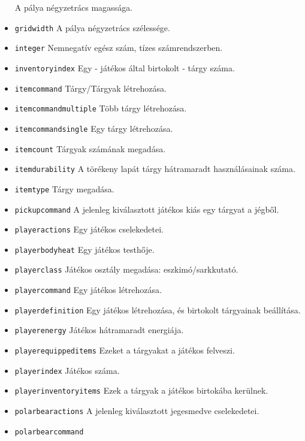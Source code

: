 \begin{itemize}
A pálya négyzetrács magassága.
\item \texttt{grid\textunderscore{}width}
A pálya négyzetrács szélessége.
\item \texttt{integer}
Nemnegatív egész szám, tízes számrendszerben.
\item \texttt{inventory\textunderscore{}index}
Egy - játékos által birtokolt - tárgy száma.
\item \texttt{item\textunderscore{}command}
Tárgy/Tárgyak létrehozása.
\item \texttt{item\textunderscore{}command\textunderscore{}multiple}
Több tárgy létrehozása.
\item \texttt{item\textunderscore{}command\textunderscore{}single}
Egy tárgy létrehozása.
\item \texttt{item\textunderscore{}count}
Tárgyak számának megadása.
\item \texttt{item\textunderscore{}durability}
A törékeny lapát tárgy hátramaradt használásainak száma.
\item \texttt{item\textunderscore{}type}
Tárgy megadása.
\item \texttt{pickup\textunderscore{}command}
A jelenleg kiválasztott játékos kiás egy tárgyat a jégből.
\item \texttt{player\textunderscore{}actions}
Egy játékos cselekedetei.
\item \texttt{player\textunderscore{}bodyheat}
Egy játékos testhője.
\item \texttt{player\textunderscore{}class}
Játékos osztály megadása: eszkimó/sarkkutató.
\item \texttt{player\textunderscore{}command}
Egy játékos létrehozása.
\item \texttt{player\textunderscore{}definition}
Egy játékos létrehozása, és birtokolt tárgyainak beállítása.
\item \texttt{player\textunderscore{}energy}
Játékos hátramaradt energiája.
\item \texttt{player\textunderscore{}equipped\textunderscore{}items}
Ezeket a tárgyakat a játékos felveszi.
\item \texttt{player\textunderscore{}index}
Játékos száma.
\item \texttt{player\textunderscore{}inventory\textunderscore{}items}
Ezek a tárgyak a játékos birtokába kerülnek.
\item \texttt{polarbear\textunderscore{}actions}
A jelenleg kiválasztott jegesmedve cselekedetei.
\item \texttt{polarbear\textunderscore{}command}

\end{itemize}
